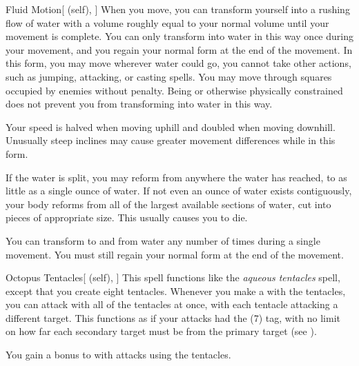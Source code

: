 \lowercase{\hypertarget{spell:Fluid Motion}{}}\label{spell:Fluid Motion}
\begin{attuneability}[Rank 5]{\hypertarget{spell:Fluid Motion}{Fluid Motion}}[ (self), ]
When you move, you can transform yourself into a rushing flow of water with a volume roughly equal to your normal volume until your movement is complete.
You can only transform into water in this way once during your movement, and you regain your normal form at the end of the movement.
In this form, you may move wherever water could go, you cannot take other actions, such as jumping, attacking, or casting spells.
You may move through squares occupied by enemies without penalty.
Being  or otherwise physically constrained does not prevent you from transforming into water in this way.

Your speed is halved when moving uphill and doubled when moving downhill.
Unusually steep inclines may cause greater movement differences while in this form.

If the water is split, you may reform from anywhere the water has reached, to as little as a single ounce of water.
If not even an ounce of water exists contiguously, your body reforms from all of the largest available sections of water, cut into pieces of appropriate size.
This usually causes you to die.

\rankline
{} You can transform to and from water any number of times during a single movement.
You must still regain your normal form at the end of the movement.
\end{attuneability}
\vspace{0.25em}



\lowercase{\hypertarget{spell:Octopus Tentacles}{}}\label{spell:Octopus Tentacles}
\begin{attuneability}[Rank 5]{\hypertarget{spell:Octopus Tentacles}{Octopus Tentacles}}[ (self), ]
This spell functions like the \textit{aqueous tentacles} spell, except that you create eight tentacles.
Whenever you make a  with the tentacles, you can attack with all of the tentacles at once, with each tentacle attacking a different target.
This functions as if your attacks had the  (7) tag, with no limit on how far each secondary target must be from the primary target (see ).

\rankline
{} You gain a  bonus to  with attacks using the tentacles.
\end{attuneability}
\vspace{0.25em}



